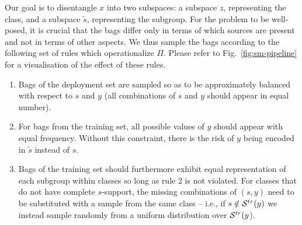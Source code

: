 Our goal is to disentangle $x$ into two subspaces: a subspace $z$, representing the class, and a
subspace $\tilde{s}$, representing the subgroup.
%
For the problem to be well-posed, it is crucial that the bags differ only
in terms of which sources are present and not in terms of other aspects.
We thus sample the bags according to the following set of rules which operationalize $\Pi$. Please
refer to Fig.~\ref{fig:sm-pipeline} for a visualisation of the effect of these rules. 
%
\begin{enumerate}\label{ls:rules}
  \item Bags of the deployment set are sampled so as to be approximately balanced with
    respect to $s$ and $y$ (all combinations of $s$ and $y$ should appear in equal number). 
  \item For bags from the training set, all possible values of $y$ should appear with equal
    frequency. Without this constraint, there is the risk of $y$ being encoded in $\tilde{s}$
    instead of $s$. 
  \item Bags of the training set should furthermore exhibit equal representation of each subgroup
    within classes so long as rule 2 is not violated.
    For classes that do not have complete $s$-support, the missing combinations of $(s, y)$ need to
    be substituted with a sample from the same class -- i.e., if $s \notin {\mathcal{S}}^{tr}(y)$ we instead
    sample randomly from a uniform distribution over ${\mathcal{S}}^{tr}(y$). 
\end{enumerate}





